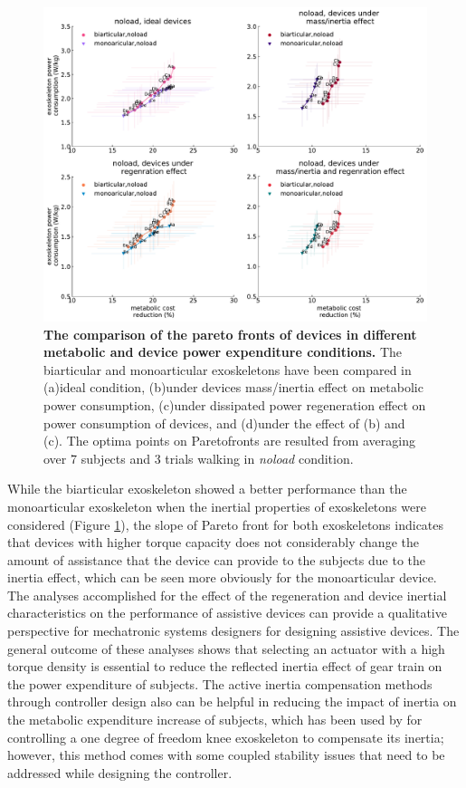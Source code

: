 \documentclass[10pt,letterpaper]{article}
\begin{document}
\begin{figure}[ht]   
	\centering
	\includegraphics[width=\linewidth]{Pareto_Mass_Regenration_Figures/PaperFigure_AddingMass_Pareto.pdf}
	\vspace{1mm}
	\caption{{\small\textbf{The comparison of the pareto fronts of devices in different metabolic and device power expenditure conditions.} The biarticular and monoarticular exoskeletons have been compared in (a)ideal condition, (b)under devices mass/inertia effect on metabolic power consumption, (c)under dissipated power regeneration effect on power consumption of devices, and (d)under the effect of (b) and (c). The optima points on Paretofronts are resulted from averaging over 7 subjects and 3 trials walking in {\it noload} condition.}}
	\label{Fig_Paretofronts_Mass_Regeneration_Effect}
\end{figure}
While the biarticular exoskeleton showed a better performance than the monoarticular exoskeleton when the inertial properties of exoskeletons were considered (Figure \ref{Fig_Paretofronts_Mass_Regeneration_Effect}), the slope of Pareto front for both exoskeletons indicates that devices with higher torque capacity does not considerably change the amount of assistance that the device can provide to the subjects due to the inertia effect, which can be seen more obviously for the monoarticular device.\\
The analyses accomplished for the effect of the regeneration and device inertial characteristics on the performance of assistive devices can provide a qualitative perspective for mechatronic systems designers for designing assistive devices. The general outcome of these analyses shows that selecting an actuator with a high torque density is essential to reduce the reflected inertia effect of gear train on the power expenditure of subjects. The active inertia compensation methods through controller design also can be helpful in reducing the impact of inertia on the metabolic expenditure increase of subjects, which has been used by \cite{148} for controlling  a one degree of freedom knee exoskeleton to compensate its inertia; however, this method comes with some coupled stability issues \cite{146,147,148} that need to be addressed while designing the controller.\\
\end{document}
